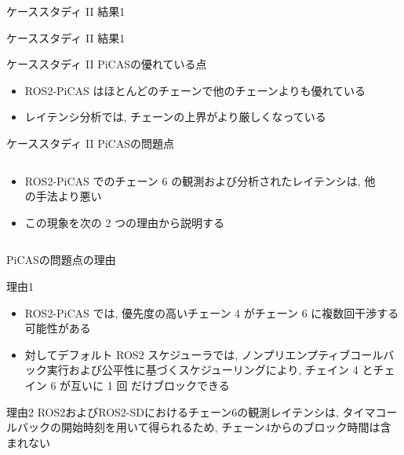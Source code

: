 \begin{frame}{ケーススタディ II 結果1}
\end{frame}

\begin{frame}{ケーススタディ II 結果1}
\end{frame}

\begin{frame}{ケーススタディ II PiCASの優れている点}
    \begin{itemize}
        \item ROS2-PiCAS はほとんどのチェーンで他のチェーンよりも優れている
        \item レイテンシ分析では, チェーンの上界がより厳しくなっている
    \end{itemize}
\end{frame}

\begin{frame}{ケーススタディ II PiCASの問題点}
    \begin{columns}
        \begin{column}{0.8\textwidth}
            \begin{itemize}
                \item ROS2-PiCAS でのチェーン 6 の観測および分析されたレイテンシは, 他の手法より悪い
                \item この現象を次の 2 つの理由から説明する
            \end{itemize}
        \end{column}
        \begin{column}{0.2\textwidth}
        \end{column}
    \end{columns}
\end{frame}

\begin{frame}{PiCASの問題点の理由}
    \vspace{1mm}
    \begin{block}{理由1}
        \setlength{\linewidth}{0.98\columnwidth}
        \begin{itemize}
            \item ROS2-PiCAS では, 優先度の高いチェーン 4 がチェーン 6 に複数回干渉する可能性がある
            \item 対してデフォルト ROS2 スケジューラでは, ノンプリエンプティブコールバック実行および公平性に基づくスケジューリングにより, チェイン 4 とチェイン 6 が互いに 1 回 だけブロックできる
        \end{itemize}
    \end{block}
    \begin{block}{理由2}
        ROS2およびROS2-SDにおけるチェーン6の観測レイテンシは, タイマコールバックの開始時刻を用いて得られるため, チェーン4からのブロック時間は含まれない
    \end{block}
\end{frame}

